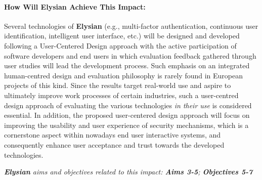 \documentclass[a4paper,11pt]{article}
\newcommand{\project}[1]{\textbf{#1}\xspace}
\newcommand{\SECURITY}{\project{Elysian}}
\newcommand{\TheProject}{\SECURITY}
\begin{document}
\begin{mdframed}[backgroundcolor=gray!10]

\paragraph{How Will \TheProject{} Achieve This Impact:} Several technologies of \TheProject{} (e.g., multi-factor authentication, continuous user identification, intelligent user interface, etc.) will be designed and developed following a User-Centered Design approach with the active participation of software developers and end users in which evaluation feedback gathered through user studies will lead the development process. Such emphasis on an integrated human-centred design and evaluation philosophy is rarely found in European projects of this kind. Since the results target real-world use and aspire to ultimately improve work processes of certain industries, such a user-centred design approach of evaluating the various technologies \emph{in their use} is considered essential. In addition, the proposed user-centered design approach will focus on improving the usability and user experience of security mechanisms, which is a cornerstone aspect within nowadays end user interactive systems, and consequently enhance user acceptance and trust towards the developed technologies.

\emph{\TheProject{} aims and objectives related to this impact: \textbf{Aims 3-5}; \textbf{Objectives 5-7} }
\end{mdframed}
\end{document}
